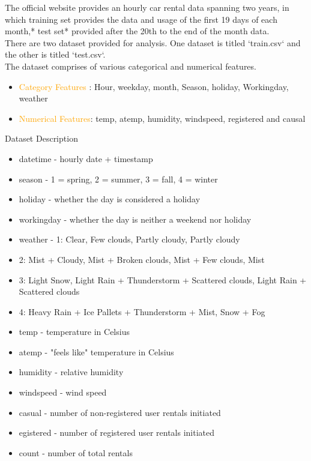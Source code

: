 The official website provides an hourly car rental data spanning two years, in which training set provides the data and usage of the first 19 days of each month,* test set* provided after the 20th to the end of the month data.\\
There are two dataset provided for analysis. 
One dataset is titled `train.csv` and the other is titled `test.csv`.\\
The dataset comprises of various categorical and numerical features. \\
\begin{itemize}
  \item \textcolor{orange}{Category Features} : Hour, weekday, month, Season, holiday, Workingday, weather 
  \item \textcolor{orange}{Numerical Features}:  temp, atemp, humidity, windspeed, registered and causal 
 
  \end{itemize}
  Dataset Description \\
\begin{itemize}
\item datetime - hourly date + timestamp  
\item season -  1 = spring, 2 = summer, 3 = fall, 4 = winter 
\item holiday - whether the day is considered a holiday
\item workingday - whether the day is neither a weekend nor holiday
\item weather - 1: Clear, Few clouds, Partly cloudy, Partly cloudy 
\item 2: Mist + Cloudy, Mist + Broken clouds, Mist + Few clouds, Mist 
\item 3: Light Snow, Light Rain + Thunderstorm + Scattered clouds, Light Rain + Scattered clouds 
\item 4: Heavy Rain + Ice Pallets + Thunderstorm + Mist, Snow + Fog 
\item temp - temperature in Celsius
\item atemp - "feels like" temperature in Celsius
\item humidity - relative humidity
\item windspeed - wind speed
\item casual - number of non-registered user rentals initiated
\item egistered - number of registered user rentals initiated
\item count - number of total rentals
\end{itemize}
